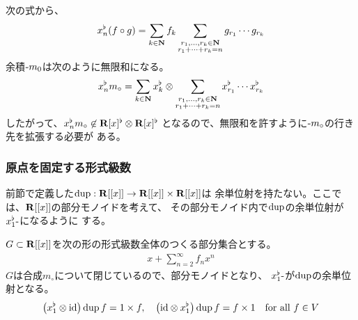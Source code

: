 {	次の式から、
	\begin{equation*}\begin{split}
		x_n^\flat(f\circ g) = \sum_{k\in\mathbf{N}} f_k 
		\sum_{\substack{r_1,\dots,r_k\in\mathbf{N}\\r_1+\cdots+r_k=n}}
		g_{r_1}\cdots g_{r_k}
	\end{split}\end{equation*}
	余積$\myhere m_0$は次のように無限和になる。
	\begin{equation*}\begin{split}
		x_n^\flat m_\circ = \sum_{k\in\mathbf{N}} 
		x_k^\flat\otimes 
		\sum_{\substack{r_1,\dots,r_k\in\mathbf{N}\\r_1+\cdots+r_k=n}}
		x_{r_1}^\flat\cdots x_{r_k}^\flat
	\end{split}\end{equation*}
	したがって、$x_n^\flat m_\circ\not\in\mathbf{R}[x]^\flat\otimes\mathbf{R}[x]^\flat$
	となるので、無限和を許すように$\myhere m_\circ$の行き先を拡張する必要が
	ある。
\subsubsection{原点を固定する形式級数}\label{s3:原点を固定する形式級数} %
	前節で定義した$\mathinner{\operatorname{dup}}:\mathbf{R}[[x]]\to\mathbf{R}[[x]]\times\mathbf{R}[[x]]$は
	余単位射を持たない。ここでは、$\mathbf{R}[[x]]$の部分モノイドを考えて、
	その部分モノイド内で$\mathinner{\operatorname{dup}}$の余単位射が$x_1^\flat\myhere$になるように
	する。

	$G\subset\mathbf{R}[[x]]$を次の形の形式級数全体のつくる部分集合とする。
	\begin{equation*}\begin{split}
		x + \sum_{n=2}^\infty f_nx^n
	\end{split}\end{equation*}
	$G$は合成$m_\circ$について閉じているので、部分モノイドとなり、
	$x_1^\flat\myhere$が$\mathinner{\operatorname{dup}}$の余単位射となる。
	\begin{equation*}\begin{split}
		\mathinner{\bigl({x_1^\flat\otimes\mathinner{\operatorname{id}}}\bigr)}\mathinner{\operatorname{dup}}f = 1\times f
		,\quad \mathinner{\bigl({\mathinner{\operatorname{id}}\otimes x_1^\flat}\bigr)}\mathinner{\operatorname{dup}}f = f\times 1
		\quad\text{for all } f\in V
	\end{split}\end{equation*}

}
